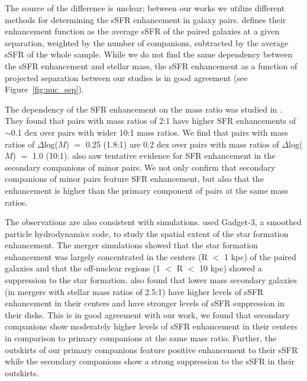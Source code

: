 \documentclass[apj,twocolumn]{emulateapj}
\begin{document}
\begin{CJK*}{UTF8}{gbsn}
The source of the difference is unclear; between our works we utilize different methods for determining the sSFR enhancement in galaxy pairs. \citet{Li:2008} defines their enhancement function as the average sSFR of the paired galaxies at a given separation, weighted by the number of companions, subtracted by the average sSFR of the whole sample. While we do not find the same dependency between the sSFR enhancement and stellar mass, the sSFR enhancement as a function of projected separation between our studies is in good agreement (see Figure~\ref{fig:nuc_sep}).

The dependency of the SFR enhancement on the mass ratio was studied in \citet{Ellison:2008}. They found that pairs with mass ratios of 2:1 have higher SFR enhancements of $\sim$0.1 dex over pairs with wider 10:1 mass ratios. We find that pairs with mass ratios of $\Delta$log($M$) $=$ 0.25 (1.8:1) are 0.2 dex over pairs with mass ratios of $\Delta$log($M$) $=$ 1.0 (10:1). \citet{Ellison:2008} also saw tentative evidence for SFR enhancement in the secondary companions of minor pairs. We not only confirm that secondary companions of minor pairs feature SFR enhancement, but also that the enhancement is higher than the primary component of pairs at the same mass ratios. 

The observations are also consistent with simulations. \citet{Moreno:2015} used {\sc Gadget}-3, a smoothed particle hydrodynamics code, to study the spatial extent of the star formation enhancement. The merger simulations showed that the star formation enhancement was largely concentrated in the centers (R $<$ 1 kpc) of the paired galaxies and that the off-nuclear regions (1 $<$ R $<$ 10 kpc) showed a suppression to the star formation. \citet{Moreno:2015} also found that lower mass secondary galaxies (in mergers with stellar mass ratios of 2.5:1) have higher levels of sSFR enhancement in their centers and have stronger levels of sSFR suppression in their disks. This is in good agreement with our work, we found that secondary companions show moderately higher levels of sSFR enhancement in their centers in comparison to primary companions at the same mass ratio. Further, the outskirts of our primary companions feature positive enhancement to their sSFR while the secondary companions show a strong suppression to the sSFR in their outskirts. 


\end{CJK*}
\end{document}
